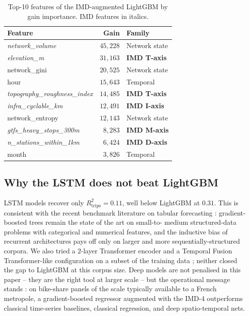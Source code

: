 \documentclass[11pt,a4paper]{article}
\begin{document}
\begin{table}[H]
\centering
\caption{Top-10 features of the IMD-augmented LightGBM by gain
importance.  IMD features in italics.}
\label{tab:fi}
\small
\begin{tabular}{@{}lrl@{}}
\toprule
Feature & Gain & Family \\
\midrule
\emph{network\_volume}              & $45{,}228$ & Network state \\
\emph{elevation\_m}                 & $31{,}163$ & \textbf{IMD T-axis} \\
network\_gini                       & $20{,}525$ & Network state \\
hour                                & $15{,}643$ & Temporal \\
\emph{topography\_roughness\_index} & $14{,}485$ & \textbf{IMD T-axis} \\
\emph{infra\_cyclable\_km}          & $12{,}491$ & \textbf{IMD I-axis} \\
network\_entropy                    & $12{,}143$ & Network state \\
\emph{gtfs\_heavy\_stops\_300m}     & $\phantom{0}8{,}283$ & \textbf{IMD M-axis} \\
\emph{n\_stations\_within\_1km}     & $\phantom{0}6{,}424$ & \textbf{IMD D-axis} \\
month                               & $\phantom{0}3{,}826$ & Temporal \\
\bottomrule
\end{tabular}
\end{table}

\subsection{Why the LSTM does not beat LightGBM}

LSTM models recover only $R^{2}_{\text{trips}} = 0.11$, well below
LightGBM at $0.31$.  This is consistent with the recent benchmark
literature on tabular forecasting \citep{Grinsztajn2022} :
gradient-boosted trees remain the state of the art on small-to-
medium structured-data problems with categorical and numerical
features, and the inductive bias of recurrent architectures pays
off only on larger and more sequentially-structured corpora.  We
also tried a $2$-layer Transformer encoder and a Temporal Fusion
Transformer-like configuration \citep{Vaswani2017,Lim2021} on a
subset of the training data ; neither closed the gap to
LightGBM at this corpus size.  Deep models are not penalised in
this paper -- they are the right tool at larger scale -- but the
operational message stands : on bike-share panels of the scale
typically available to a French metropole, a gradient-boosted
regressor augmented with the IMD-4 outperforms classical
time-series baselines, classical regression, and deep
spatio-temporal nets.
\end{document}
